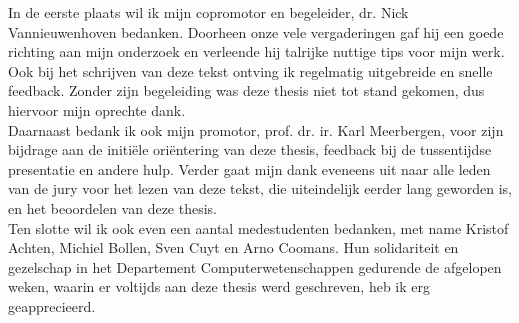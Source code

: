 \documentclass[master=cws,masteroption=ci]{kulemt}
\begin{document}
\begin{preface}
In de eerste plaats wil ik mijn copromotor en begeleider, dr. Nick Vannieuwenhoven bedanken. Doorheen onze vele vergaderingen gaf hij een goede richting aan mijn onderzoek en verleende hij talrijke nuttige tips voor mijn werk. Ook bij het schrijven van deze tekst ontving ik regelmatig uitgebreide en snelle feedback. Zonder zijn begeleiding was deze thesis niet tot stand gekomen, dus hiervoor mijn oprechte dank.\\

Daarnaast bedank ik ook mijn promotor, prof. dr. ir. Karl Meerbergen, voor zijn bijdrage aan de initi\"ele ori\"entering van deze thesis, feedback bij de tussentijdse presentatie en andere hulp. Verder gaat mijn dank eveneens uit naar alle leden van de jury voor het lezen van deze tekst, die uiteindelijk eerder lang geworden is, en het beoordelen van deze thesis.\\

Ten slotte wil ik ook even een aantal medestudenten bedanken, met name Kristof Achten, Michiel Bollen, Sven Cuyt en Arno Coomans. Hun solidariteit en gezelschap in het Departement Computerwetenschappen gedurende de afgelopen weken, waarin er voltijds aan deze thesis werd geschreven, heb ik erg geapprecieerd.
\end{preface}

\tableofcontents*
\end{document}
